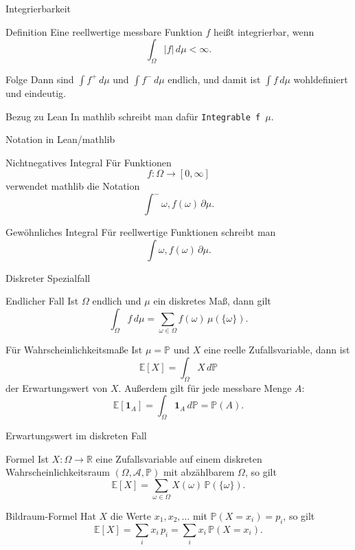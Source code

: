 \documentclass{beamer}
\begin{document}
\begin{frame}{Integrierbarkeit}
\begin{block}{Definition}
Eine reellwertige messbare Funktion \(f\) hei\ss{}t integrierbar, wenn
\[
\int_\Omega |f|\,d\mu<\infty.
\]
\end{block}

\begin{block}{Folge}
Dann sind \(\int f^+\,d\mu\) und \(\int f^-\,d\mu\) endlich, und damit ist \(\int f\,d\mu\) wohldefiniert und eindeutig.
\end{block}

\begin{block}{Bezug zu Lean}
In mathlib schreibt man dafür \texttt{Integrable f $\mu$}.
\end{block}
\end{frame}


\begin{frame}{Notation in Lean/mathlib}
\begin{block}{Nichtnegatives Integral}
Für Funktionen
\[
f\colon \Omega\to[0,\infty]
\]
verwendet mathlib die Notation
\[
\int^- \omega, f(\omega)\,\partial\mu.
\]
\end{block}

\begin{block}{Gewöhnliches Integral}
Für reellwertige Funktionen schreibt man
\[
\int \omega, f(\omega)\,\partial\mu.
\]
\end{block}
\end{frame}

\begin{frame}{Diskreter Spezialfall}
\begin{block}{Endlicher Fall}
Ist \(\Omega\) endlich und \(\mu\) ein diskretes Maß, dann gilt
\[
\int_\Omega f\,d\mu
=
\sum_{\omega\in\Omega} f(\omega)\,\mu(\{\omega\}).
\]
\end{block}

\begin{block}{Für Wahrscheinlichkeitsmaße}
Ist \(\mu=\mathbb P\) und $X$ eine reelle Zufallsvariable, dann ist
\[
\mathbb E[X]=\int_\Omega X\,d\mathbb P
\]
der Erwartungswert von $X$. Außerdem gilt für jede messbare Menge \(A\):
\[
\mathbb E[\mathbf{1}_A]=\int_\Omega \mathbf{1}_A\,d\mathbb P = \mathbb P(A).
\]
\end{block}
\end{frame}

\begin{frame}{Erwartungswert im diskreten Fall}
\begin{block}{Formel}
Ist \(X\colon\Omega\to\mathbb R\) eine Zufallsvariable auf einem diskreten Wahrscheinlichkeitsraum
\((\Omega,\mathcal A,\mathbb P)\) mit abzählbarem \(\Omega\), so gilt
\[
\mathbb E[X]=\sum_{\omega\in\Omega} X(\omega)\,\mathbb P(\{\omega\}).
\]
\end{block}

\begin{block}{Bildraum-Formel}
Hat \(X\) die Werte \(x_1,x_2,\ldots\) mit \(\mathbb P(X=x_i)=p_i\), so gilt
\[
\mathbb E[X]=\sum_{i} x_i\,p_i = \sum_{i} x_i\,\mathbb P(X=x_i).
\]
\end{block}
\end{frame}
\end{document}
